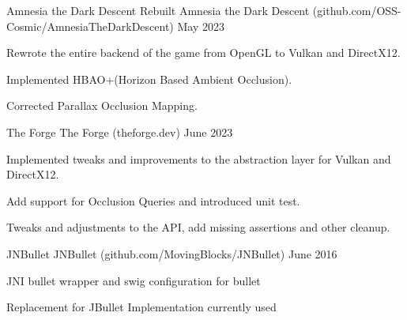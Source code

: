 

\begin{cventries}
  
  \cventry
  {Amnesia the Dark Descent Rebuilt} %
  {Amnesia the Dark Descent ({\tiny github.com/OSS-Cosmic/AmnesiaTheDarkDescent})} %
  {} 
  { May 2023 }
  {
    \begin{cvitems} %
      \item{Rewrote the entire backend of the game from OpenGL to Vulkan and DirectX12.}
      \item{Implemented HBAO+(Horizon Based Ambient Occlusion).}
      \item{Corrected Parallax Occlusion Mapping.}
    \end{cvitems}
  }


  \cventry
  {The Forge} %
  {The Forge ({\tiny theforge.dev})} %
  {} 
  { June 2023 }
  {
    \begin{cvitems} %
      \item{Implemented tweaks and improvements to the abstraction layer for Vulkan and DirectX12.}
      \item{Add support for Occlusion Queries and introduced unit test.}
      \item{Tweaks and adjustments to the API, add missing assertions and other cleanup.}
    \end{cvitems}
  }
  

    \cventry
    {JNBullet} %
    {JNBullet ({\tiny github.com/MovingBlocks/JNBullet})} %
    {} %
    { June 2016 } %
    {
      \begin{cvitems} %
        \item{JNI bullet wrapper and swig configuration for bullet}
        \item{Replacement for JBullet Implementation currently used }
      \end{cvitems}
    }
    


\end{cventries}
